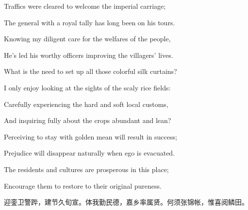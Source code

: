 \begin{BookQuote}
Traffics were cleared to welcome the imperial carriage;
\end{BookQuote}

\begin{BookQuote}
The general with a royal tally has long been on his tours.
\end{BookQuote}

\begin{BookQuote}
Knowing my diligent care for the welfares of the people,
\end{BookQuote}

\begin{BookQuote}
He's led his worthy officers improving the villagers' lives.
\end{BookQuote}

\begin{BookQuote}
What is the need to set up all those colorful silk curtains?
\end{BookQuote}

\begin{BookQuote}
I only enjoy looking at the sights of the scaly rice fields:
\end{BookQuote}

\begin{BookQuote}
Carefully experiencing the hard and soft local customs,
\end{BookQuote}

\begin{BookQuote}
And inquiring fully about the crops abundant and lean?
\end{BookQuote}

\begin{BookQuote}
Perceiving to stay with golden mean will result in success;
\end{BookQuote}

\begin{BookQuote}
Prejudice will disappear naturally when ego is evacuated.
\end{BookQuote}

\begin{BookQuote}
The residents and cultures are prosperous in this place;
\end{BookQuote}

\begin{BookQuote}
Encourage them to restore to their original pureness.
\end{BookQuote}

\begin{BookQuote}
迎銮卫警跸，建节久旬宣。体我勤民德，嘉乡率属贤。何须张锦帐，惟喜阅鳞田。
\end{BookQuote}

